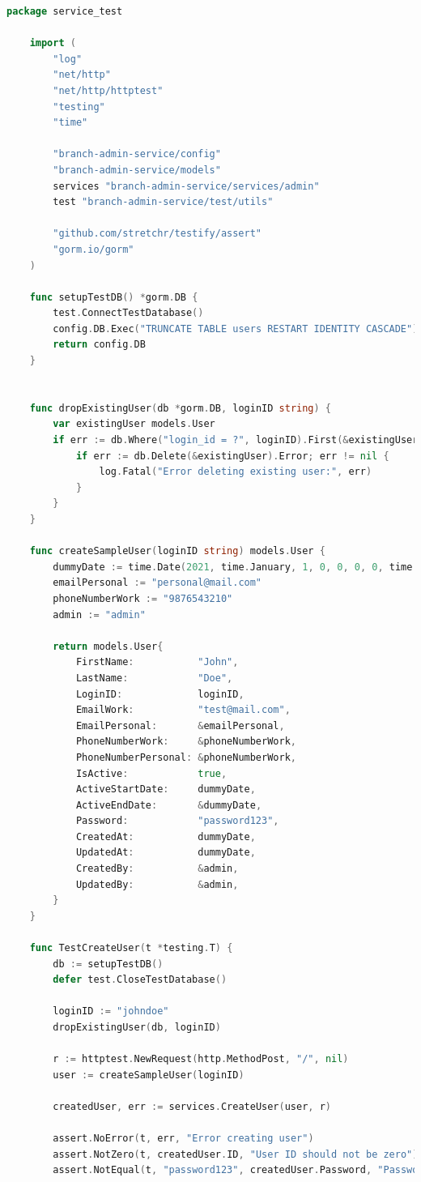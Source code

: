 \begin{lstlisting}[language=Go, frame=single]
	package service_test

	import (
		"log"
		"net/http"
		"net/http/httptest"
		"testing"
		"time"
	
		"branch-admin-service/config"
		"branch-admin-service/models"
		services "branch-admin-service/services/admin"
		test "branch-admin-service/test/utils"
	
		"github.com/stretchr/testify/assert"
		"gorm.io/gorm"
	)
	
	func setupTestDB() *gorm.DB {
		test.ConnectTestDatabase()
		config.DB.Exec("TRUNCATE TABLE users RESTART IDENTITY CASCADE") 
		return config.DB
	}
	
	
	func dropExistingUser(db *gorm.DB, loginID string) {
		var existingUser models.User
		if err := db.Where("login_id = ?", loginID).First(&existingUser).Error; err == nil {
			if err := db.Delete(&existingUser).Error; err != nil {
				log.Fatal("Error deleting existing user:", err)
			}
		}
	}
	
	func createSampleUser(loginID string) models.User {
		dummyDate := time.Date(2021, time.January, 1, 0, 0, 0, 0, time.UTC)
		emailPersonal := "personal@mail.com"
		phoneNumberWork := "9876543210"
		admin := "admin"
	
		return models.User{
			FirstName:           "John",
			LastName:            "Doe",
			LoginID:             loginID,
			EmailWork:           "test@mail.com",
			EmailPersonal:       &emailPersonal,
			PhoneNumberWork:     &phoneNumberWork,
			PhoneNumberPersonal: &phoneNumberWork,
			IsActive:            true,
			ActiveStartDate:     dummyDate,
			ActiveEndDate:       &dummyDate,
			Password:            "password123",
			CreatedAt:           dummyDate,
			UpdatedAt:           dummyDate,
			CreatedBy:           &admin,
			UpdatedBy:           &admin,
		}
	}
	
	func TestCreateUser(t *testing.T) {
		db := setupTestDB()
		defer test.CloseTestDatabase()
	
		loginID := "johndoe"
		dropExistingUser(db, loginID)
	
		r := httptest.NewRequest(http.MethodPost, "/", nil)
		user := createSampleUser(loginID)
	
		createdUser, err := services.CreateUser(user, r)
	
		assert.NoError(t, err, "Error creating user")
		assert.NotZero(t, createdUser.ID, "User ID should not be zero")
		assert.NotEqual(t, "password123", createdUser.Password, "Password should be hashed")
	

\end{lstlisting}
